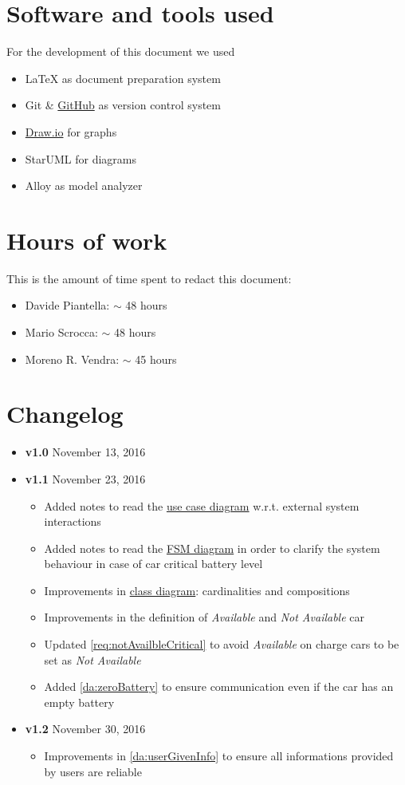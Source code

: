 \begin{appendices}
	\section{Software and tools used}
	For the development of this document we used
	\begin{itemize}
		\item \LaTeX{} as document preparation system
		\item Git \& \href{http://github.com}{GitHub} as version control system
		\item \href{http://draw.io}{Draw.io} for graphs
		\item StarUML for diagrams
		\item Alloy as model analyzer
	\end{itemize}
	
	\section{Hours of work}
	This is the amount of time spent to redact this document:
	\begin{itemize}
		\item Davide Piantella: $\sim$ 48 hours
		\item Mario Scrocca: $\sim$ 48 hours
		\item Moreno R. Vendra: $\sim$ 45 hours
	\end{itemize}
	
	\section{Changelog}
	\begin{itemize}
		\item \textbf{v1.0} November 13, 2016
		\item \textbf{v1.1} November 23, 2016
		\begin{itemize}
			\item Added notes to read the \hyperref[fig:usecase]{use case diagram} w.r.t. external system interactions
			\item Added notes to read the \hyperref[fig:carFSA]{FSM diagram} in order to clarify the system behaviour in case of car critical battery level
			\item Improvements in \hyperref[fig:classDiagram]{class diagram}: cardinalities and compositions
			\item Improvements in the definition of \emph{Available} and \emph{Not Available} car
			\item Updated \ref{req:notAvailbleCritical} to avoid \emph{Available} on charge cars to be set as \emph{Not Available}
			\item Added \ref{da:zeroBattery} to ensure communication even if the car has an empty battery
		\end{itemize}
		\item \textbf{v1.2} November 30, 2016
		\begin{itemize}
			\item Improvements in \ref{da:userGivenInfo} to ensure all informations provided by users are reliable
		\end{itemize}
	\end{itemize}
\end{appendices}
